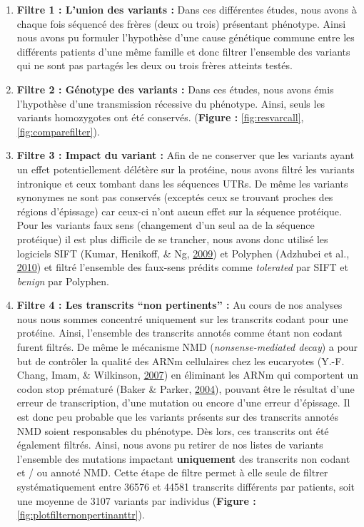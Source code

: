 \documentclass[12pt,twoside]{reedthesis}
\providecommand{\tightlist}{%
  \setlength{\itemsep}{0pt}\setlength{\parskip}{0pt}}
\theoremstyle{definition}
\theoremstyle{definition}
\theoremstyle{remark}
\begin{document}
  \begin{enumerate}
  \def\labelenumi{\arabic{enumi}.}
  \tightlist
  \item
    \textbf{Filtre 1 : L'union des variants :} Dans ces différentes
    études, nous avons à chaque fois séquencé des frères (deux ou trois)
    présentant phénotype. Ainsi nous avons pu formuler l'hypothèse d'une
    cause génétique commune entre les différents patients d'une même
    famille et donc filtrer l'ensemble des variants qui ne sont pas
    partagés les deux ou trois frères atteints testés.\\
  \item
    \textbf{Filtre 2 : Génotype des variants :} Dans ces études, nous
    avons émis l'hypothèse d'une transmission récessive du phénotype.
    Ainsi, seuls les variants homozygotes ont été conservés.
    (\textbf{Figure : }\ref{fig:resvarcall}, \ref{fig:comparefilter}).\\
  \item
    \textbf{Filtre 3 : Impact du variant :} Afin de ne conserver que les
    variants ayant un effet potentiellement délétère sur la protéine, nous
    avons filtré les variants intronique et ceux tombant dans les
    séquences UTRs. De même les variants synonymes ne sont pas conservés
    (exceptés ceux se trouvant proches des régions d'épissage) car ceux-ci
    n'ont aucun effet sur la séquence protéique. Pour les variants faux
    sens (changement d'un seul aa de la séquence protéique) il est plus
    difficile de se trancher, nous avons donc utilisé les logiciels SIFT
    (Kumar, Henikoff, \& Ng, \protect\hyperlink{ref-Kumar2009}{2009}) et
    Polyphen (Adzhubei et al., \protect\hyperlink{ref-Adzhubei2010}{2010})
    et filtré l'ensemble des faux-sens prédits comme \emph{tolerated} par
    SIFT et \emph{benign} par Polyphen.\\
  \item
    \textbf{Filtre 4 : Les transcrits ``non pertinents'' :} Au cours de
    nos analyses nous nous sommes concentré uniquement sur les transcrits
    codant pour une protéine. Ainsi, l'ensemble des transcrits annotés
    comme étant non codant furent filtrés. De même le mécanisme NMD
    (\emph{nonsense-mediated decay}) a pour but de contrôler la qualité
    des ARNm cellulaires chez les eucaryotes (Y.-F. Chang, Imam, \&
    Wilkinson, \protect\hyperlink{ref-Chang2007}{2007}) en éliminant les
    ARNm qui comportent un codon stop prématuré (Baker \& Parker,
    \protect\hyperlink{ref-Baker2004}{2004}), pouvant être le résultat
    d'une erreur de transcription, d'une mutation ou encore d'une erreur
    d'épissage. Il est donc peu probable que les variants présents sur des
    transcrits annotés NMD soient responsables du phénotype. Dès lors, ces
    transcrits ont été également filtrés. Ainsi, nous avons pu retirer de
    nos listes de variants l'ensemble des mutations impactant
    \textbf{uniquement} des transcrits non codant et / ou annoté NMD.
    Cette étape de filtre permet à elle seule de filtrer systématiquement
    entre 36576 et 44581 transcrits différents par patients, soit une
    moyenne de 3107 variants par individus (\textbf{Figure :
    }\ref{fig:plotfilternonpertinanttr}).
  \end{enumerate}
  
\end{document}
